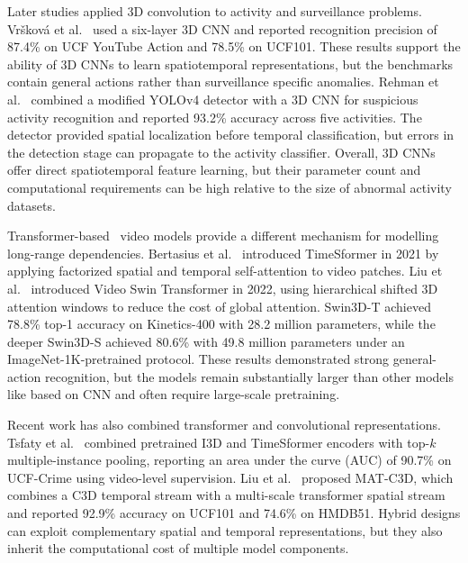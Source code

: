 \documentclass[journal,article,submit,moreauthors]{Definitions/mdpi}
\begin{document}
    Later studies applied 3D convolution to activity and surveillance problems. 
    Vršková et al.~\cite{vrskova2022_3dcnn} used a six-layer 3D CNN and 
    reported recognition precision of 87.4\% on UCF YouTube Action and 78.5\% 
    on UCF101. These results support the ability of 3D CNNs to learn spatiotemporal
    representations, but the benchmarks contain general actions rather than 
    surveillance specific anomalies. Rehman et al.~\cite{rehman2022} combined a 
    modified YOLOv4 detector with a 3D CNN for suspicious activity recognition 
    and reported 93.2\% accuracy across five activities. The detector provided
    spatial localization before temporal classification, but errors in the 
    detection stage can propagate to the activity classifier. Overall, 3D CNNs 
    offer direct spatiotemporal feature learning, but their parameter count and 
    computational requirements can be high relative to the size of abnormal 
    activity datasets.

    Transformer-based~\cite{vaswani2017attention,dosovitskiy2021vit} video 
    models provide a different mechanism for modelling long-range 
    dependencies. Bertasius et al.~\cite{bertasius2021timesformer} introduced 
    TimeSformer in 2021 by applying factorized spatial and temporal
    self-attention to video patches. Liu et al.~\cite{liu2022videoswin} 
    introduced Video Swin Transformer in 2022, using hierarchical shifted 
    3D attention windows to reduce the cost of global attention. Swin3D-T 
    achieved 78.8\% top-1 accuracy on Kinetics-400 with 28.2 million parameters,
    while the deeper Swin3D-S achieved 80.6\% with 49.8 million parameters 
    under an ImageNet-1K-pretrained protocol. These results demonstrated strong
    general-action recognition, but the models remain substantially larger than 
    other models like based on CNN and often require large-scale pretraining.

    Recent work has also combined transformer and convolutional representations.
    Tsfaty et al.~\cite{dual_backbone_2025} combined pretrained I3D and 
    TimeSformer encoders with top-$k$ multiple-instance pooling, reporting an area
    under the curve (AUC) of 90.7\% on UCF-Crime using video-level supervision. Liu et
    al.~\cite{liu2025} proposed MAT-C3D, which combines a C3D temporal stream
    with a multi-scale transformer spatial stream and reported 92.9\% accuracy
    on UCF101 and 74.6\% on HMDB51. Hybrid designs can exploit complementary 
    spatial and temporal representations, but they also inherit the 
    computational cost of multiple model components.
\end{document}

